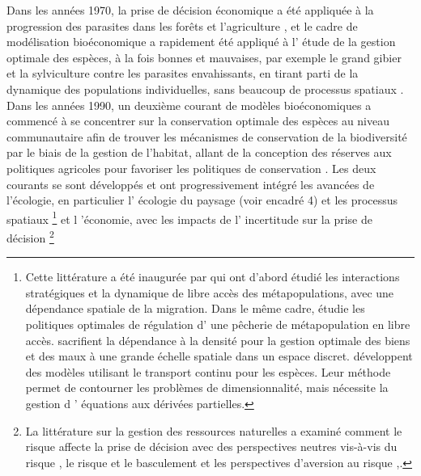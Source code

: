 \begin{displayquote}
\begin{displayquote}
\begin{displayquote}
{{{Dans les années 1970, la prise de décision économique a été appliquée à la progression des parasites dans les forêts et l'agriculture \citep{Hueth1974, Feder1975}, et le cadre de modélisation bioéconomique a rapidement été appliqué à l' étude de la gestion optimale des espèces, à la fois bonnes et mauvaises, par exemple le grand gibier et la sylviculture contre les parasites envahissants, en tirant parti de la dynamique des populations individuelles, sans beaucoup de processus spatiaux \citep{swanson_economics_1994, Skonhoft1999_on,ALEXANDER2000, Horan2002}.  Dans les années 1990, un deuxième courant de modèles bioéconomiques a commencé à se concentrer sur la conservation optimale des espèces au niveau communautaire afin de trouver les mécanismes de conservation de la biodiversité par le biais de la gestion de l'habitat, allant de la conception des réserves aux politiques agricoles pour favoriser les politiques de conservation \citep{costello_dynamic_2004, Polasky2001,Polasky2005, Watzold2016a, Mouysset2011}. Les deux courants se sont développés et ont progressivement intégré les avancées de l'écologie, en particulier l' écologie du paysage (voir encadré 4) et les processus spatiaux \footnote{Cette littérature a été inaugurée par \cite{huffaker_optimal_1992, brown_metapopulation_1997, sanchirico_bioeconomics_1999} qui ont d'abord étudié les interactions stratégiques et la dynamique de libre accès des métapopulations, avec une dépendance spatiale de la migration. Dans le même cadre, \cite{SANCHIRICO200523} étudie les politiques optimales de régulation d' une pêcherie de métapopulation en libre accès. \cite{costello_optimal_2008, blackwood_cost-effective_2010} sacrifient la dépendance à la densité pour la gestion optimale des biens et des maux à une grande échelle spatiale dans un espace discret. \cite{brock_pattern_2010, brock_2020} développent des modèles utilisant le transport continu pour les espèces. Leur méthode permet de contourner les problèmes de dimensionnalité, mais nécessite la gestion d ' équations aux dérivées partielles. } et l 'économie, avec les impacts de l' incertitude sur la prise de décision \footnote{La littérature sur la gestion des ressources naturelles a examiné comment le risque affecte la prise de décision avec des perspectives neutres vis-à-vis du risque \citep{reed_1979_optimal, costello_optimal_2008}, le risque et le basculement \citep{costello_renewable_2019} et les perspectives d'aversion au risque \citep{McGoughPlantingaCostello+2009,kapaun_does_2013,TAHVONEN2018659},.

}}}}
\end{displayquote}
\end{displayquote}
\end{displayquote}
